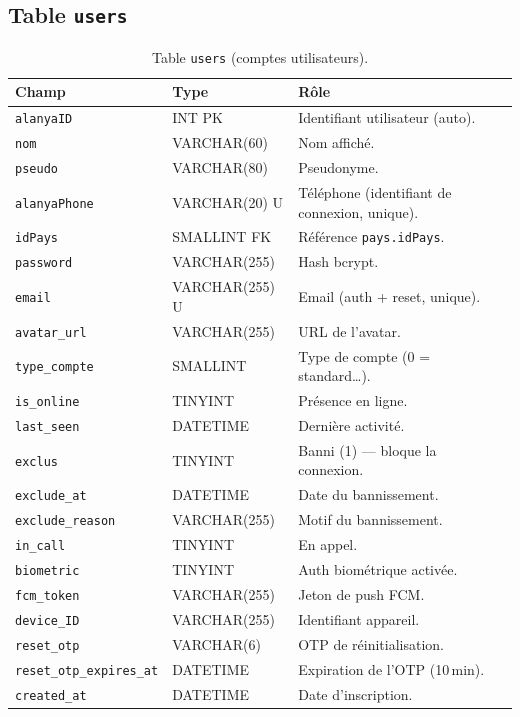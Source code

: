 \documentclass[11pt,a4paper,oneside]{report}
\newcommand{\thd}[1]{\textbf{\textcolor{AlanyaIndigoDark}{#1}}}
\begin{document}
\subsection{Table \texttt{users}}
\begin{table}[H]
\centering
\begin{tabularx}{\linewidth}{@{}l l X@{}}
\toprule
\thd{Champ} & \thd{Type} & \thd{R\^{o}le}\\
\midrule
\texttt{alanyaID}           & INT PK       & Identifiant utilisateur (auto).\\
\texttt{nom}                & VARCHAR(60)  & Nom affich\'{e}.\\
\texttt{pseudo}             & VARCHAR(80)  & Pseudonyme.\\
\texttt{alanyaPhone}        & VARCHAR(20) U & T\'{e}l\'{e}phone (identifiant de connexion, unique).\\
\texttt{idPays}             & SMALLINT FK  & R\'{e}f\'{e}rence \texttt{pays.idPays}.\\
\texttt{password}           & VARCHAR(255) & Hash bcrypt.\\
\texttt{email}              & VARCHAR(255) U & Email (auth + reset, unique).\\
\texttt{avatar\_url}        & VARCHAR(255) & URL de l'avatar.\\
\texttt{type\_compte}       & SMALLINT     & Type de compte (0 = standard\ldots).\\
\texttt{is\_online}         & TINYINT      & Pr\'{e}sence en ligne.\\
\texttt{last\_seen}         & DATETIME     & Derni\`{e}re activit\'{e}.\\
\texttt{exclus}             & TINYINT      & Banni (1) --- bloque la connexion.\\
\texttt{exclude\_at}        & DATETIME     & Date du bannissement.\\
\texttt{exclude\_reason}    & VARCHAR(255) & Motif du bannissement.\\
\texttt{in\_call}           & TINYINT      & En appel.\\
\texttt{biometric}          & TINYINT      & Auth biom\'{e}trique activ\'{e}e.\\
\texttt{fcm\_token}         & VARCHAR(255) & Jeton de push FCM.\\
\texttt{device\_ID}         & VARCHAR(255) & Identifiant appareil.\\
\texttt{reset\_otp}         & VARCHAR(6)   & OTP de r\'{e}initialisation.\\
\texttt{reset\_otp\_expires\_at} & DATETIME & Expiration de l'OTP (10\,min).\\
\texttt{created\_at}        & DATETIME     & Date d'inscription.\\
\bottomrule
\end{tabularx}
\caption{Table \texttt{users} (comptes utilisateurs).}
\end{table}
\end{document}
